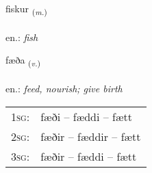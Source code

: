 \documentclass[frontgrid, backgrid]{flacards}\usepackage[]{graphicx}\usepackage[]{xcolor}
\begin{document}
\renewcommand{\flhead}{\vskip5pt \fboxsep=0pt {\small\bfseries\footnotesize Nafnorð | Noun}}
\renewcommand{\fcfoot}{\vskip5pt \fboxsep=0pt \hspace{2pt}{\small\bfseries\footnotesize 1K}}

\renewcommand{\blhead}{\vskip5pt {\small\bfseries\footnotesize Nafnorð | Noun }}
\renewcommand{\bcfoot}{\vskip5pt \hspace{2pt}{\small\bfseries\footnotesize 1K}}


{fiskur \small{\textsubscript{(\textit{m.})}} \\[1ex] %
\textphonetic{[fɪskʏr]} \\
en.: \emph{fish} \\  [2ex]
\renewcommand*{\arraystretch}{0.8}
}

\renewcommand{\flhead}{\vskip5pt \fboxsep=0pt {\small\bfseries\footnotesize Sagnorð | Verb}}
\renewcommand{\fcfoot}{\vskip5pt \fboxsep=0pt \hspace{2pt}{\small\bfseries\footnotesize 1K}}

\renewcommand{\blhead}{\vskip5pt {\small\bfseries\footnotesize Sagnorð | Verb }}
\renewcommand{\bcfoot}{\vskip5pt \hspace{2pt}{\small\bfseries\footnotesize 1K}}


{fæða \small{\textsubscript{(\textit{v.})}} \\[1ex] %
\textphonetic{[faiːða]} \\
en.: \emph{feed, nourish; give birth} \\  [2ex]
\renewcommand*{\arraystretch}{0.8}
\begin{tabular}{p{1cm}l}
\textsc{1sg}: & fæði -- fæddi -- fætt \\ 
\textsc{2sg}: & fæðir -- fæddir -- fætt \\ 
\textsc{3sg}: & fæðir -- fæddi -- fætt \\ 
\end{tabular}
}
\end{document}
